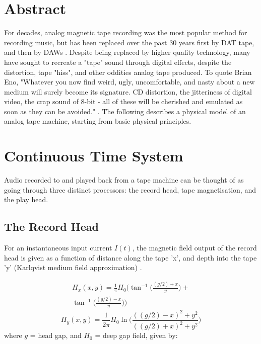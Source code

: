 \documentclass[twoside,a4paper]{article}
\title{\papertitle}
\affiliation{
\paperauthorA \,}
{\href{http://ccrma.stanford.edu}{Center for Computer Research in Music and Acoustics} \\ Stanford University \\ Palo Alto, CA \\ {\tt \href{mailto:jatin@ccrma.stanford.edu}{jatin@ccrma.stanford.edu}}}
\newif\ifpdf
\begin{document}
\ifpdf %
  \DeclareGraphicsExtensions{.png,.jpg,.pdf}
\else  %
\fi

\maketitle

\section{Abstract}
For decades, analog magnetic tape recording was the most popular
method for recording music, but has been replaced over the past 30 years first by
DAT tape, and then by DAWs \cite{Kadis}. Despite being replaced
by higher quality technology,
many have sought to recreate a "tape" sound through digital effects, despite
the distortion, tape "hiss", and other oddities analog tape produced.
To quote Brian Eno, "Whatever you now find weird, ugly, uncomfortable, and nasty
about a new medium will surely become its signature. CD distortion, the jitteriness
of digital video, the crap sound of 8-bit - all of these will be cherished
and emulated as soon as they can be avoided." \cite{Eno}. The following describes
a physical model of an analog tape machine, starting from basic physical
principles.

\section{Continuous Time System}
Audio recorded to and played back from a tape machine can be thought of as going
through three distinct processors: the record head, tape magnetisation, and the play
head.

\subsection{The Record Head}
For an instantaneous input current $I(t)$, the magnetic field output of the record 
head is given as a function of distance along the tape 'x', and depth into 
the tape 'y' (Karlqvist medium field approximation) \cite{1994tmr..book.....B}.

\begin{multline}
    H_x(x,y) = \frac{1}{\pi} H_0 \Big(\tan^{-1} \Big(\frac{(g/2) + x}{y} \Big) + \\
    \tan^{-1} \Big(\frac{(g/2) - x}{y} \Big) \Big)
    \label{eq1}
\end{multline}
\begin{equation}
    H_y(x,y) = \frac{1}{2 \pi} H_0 \ln \Big(\frac{((g/2) - x)^2 + y^2}{((g/2) + x)^2 + y^2} \Big)
    \label{eq2}
\end{equation}
%
where $g$ = head gap, and $H_0$ = deep gap field, given by:
\end{document}

